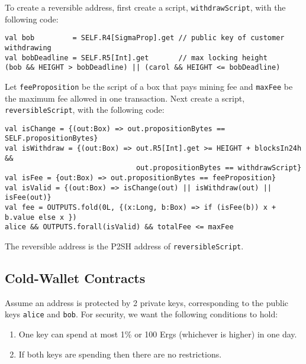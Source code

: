 \documentclass[11pt]{article}
\begin{document}
To create a reversible address, first create a script, \texttt{withdrawScript}, with the following code:
\begin{verbatim}
val bob         = SELF.R4[SigmaProp].get // public key of customer withdrawing
val bobDeadline = SELF.R5[Int].get       // max locking height
(bob && HEIGHT > bobDeadline) || (carol && HEIGHT <= bobDeadline)
\end{verbatim}

Let \texttt{feeProposition} be the script of a box that pays mining fee and \texttt{maxFee} be the maximum fee allowed in one transaction. 
Next create a script, \texttt{reversibleScript}, with the following code:
\begin{verbatim}
val isChange = {(out:Box) => out.propositionBytes == SELF.propositionBytes}
val isWithdraw = {(out:Box) => out.R5[Int].get >= HEIGHT + blocksIn24h &&
                               out.propositionBytes == withdrawScript}
val isFee = {out:Box) => out.propositionBytes == feeProposition}
val isValid = {(out:Box) => isChange(out) || isWithdraw(out) || isFee(out)}
val fee = OUTPUTS.fold(0L, {(x:Long, b:Box) => if (isFee(b)) x + b.value else x })
alice && OUTPUTS.forall(isValid) && totalFee <= maxFee
\end{verbatim}

The reversible address is the P2SH address of \texttt{reversibleScript}. 

\subsection{Cold-Wallet Contracts}

Assume an address is protected by 2 private keys, corresponding to the public keys \texttt{alice} and \texttt{bob}. For security, we want the following conditions to hold:

\begin{enumerate}
	\item One key can spend at most 1\% or 100 Ergs (whichever is higher) in one day.
	\item If both keys are spending then there are no restrictions. 
\end{enumerate}
\end{document}

